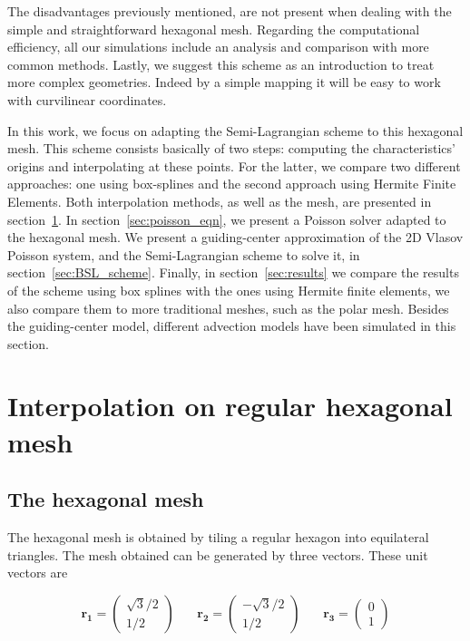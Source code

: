 \documentclass[proc]{edpsmath}
\begin{document}
The disadvantages previously mentioned, are not present when dealing with the simple and straightforward hexagonal mesh. Regarding the computational efficiency, all our simulations include an analysis and comparison with more common methods. Lastly, we suggest this scheme as an introduction to treat more complex geometries. Indeed by a simple mapping it will be easy to work with curvilinear coordinates.

In this work, we focus on adapting the Semi-Lagrangian scheme to this hexagonal mesh. This scheme consists basically of two steps: computing the characteristics' origins and interpolating at these points. For the latter, we compare two different approaches: one using box-splines and the second approach using Hermite Finite Elements. Both interpolation methods, as well as the mesh, are presented in section~\ref{sec:interpolation}. In section~\ref{sec:poisson_eqn}, we present a Poisson solver adapted to the hexagonal mesh. We present a guiding-center approximation of the 2D Vlasov Poisson system\cite{Golse1998865}, and the Semi-Lagrangian scheme to solve it, in section~\ref{sec:BSL_scheme}. Finally, in section~\ref{sec:results} we compare the results of the scheme using box splines with the ones using Hermite finite elements, we also compare them to more traditional meshes, such as the polar mesh. Besides the guiding-center model, different advection models have been simulated in this section.


\section{Interpolation on regular hexagonal mesh}
\label{sec:interpolation}
\subsection{The hexagonal mesh}

The hexagonal mesh is obtained by tiling a regular hexagon into equilateral triangles. The mesh obtained can be generated by three vectors. These unit vectors are

\begin{equation}
	\mathbf{r_1} = \begin{pmatrix}\sqrt{3}/2 \\  1/2
		\end{pmatrix} ~~~~~~~~
	\mathbf{r_2} = \begin{pmatrix}-\sqrt{3}/2 \\ 1/2
		\end{pmatrix} ~~~~~~~~
	\mathbf{r_3} = \begin{pmatrix} 0 \\ 1
		\end{pmatrix}
\end{equation}
\end{document}
